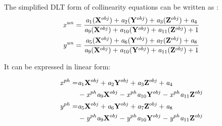 \documentclass[a4paper,12pt]{article}
\newcommand{\evect}[1]{%
{\bf #1}%
}
\newcommand{\escal}[1]{%
{\it #1}%
}
\begin{document}
The simplified DLT form of collinearity equations can be written as \cite[p. 130]{pavelka2004foto10}:  
\begin{equation}
\begin{split}
&\escal{x}^{un} = \frac{\escal{a}_{1}(\evect{X}^{obj}) + 
                                  \escal{a}_{2}(\evect{Y}^{obj}) + 
                                  \escal{a}_{3}(\evect{Z}^{obj}) +
                                  \escal{a}_{4}
                                  }{
				  \escal{a}_{9}(\evect{X}^{obj}) + 
                                  \escal{a}_{10}(\evect{Y}^{obj}) + 
                                  \escal{a}_{11}(\evect{Z}^{obj}) +
                                   1  
                                  } \\
&\escal{y}^{un} = \frac{\escal{a}_{5}(\evect{X}^{obj}) + 
                                  \escal{a}_{6}(\evect{Y}^{obj}) + 
                                  \escal{a}_{7}(\evect{Z}^{obj}) +                                 
                                  \escal{a}_{8}
                                  }{
				  \escal{a}_{9}(\evect{X}^{obj}) + 
                                  \escal{a}_{10}(\evect{Y}^{obj}) + 
                                  \escal{a}_{11}(\evect{Z}^{obj}) +    
                                  1
                                  }
\end{split}
\end{equation}
 
It can be expressed in linear form:

\begin{equation}
\begin{split}
\escal{x}^{ph} =& \escal{a}_{1}\evect{X}^{obj} + 
                                  \escal{a}_{2}\evect{Y}^{obj} + 
                                  \escal{a}_{3}\evect{Z}^{obj} +
                                  \escal{a}_{4} \\
				  &- \escal{x}^{ph} \escal{a}_{9}\evect{X}^{obj} -
                                  \escal{x}^{ph} \escal{a}_{10}\evect{Y}^{obj} - 
                                  \escal{x}^{ph} \escal{a}_{11}\evect{Z}^{obj} \\
\escal{y}^{ph} =& \escal{a}_{5}\evect{X}^{obj} + 
                                  \escal{a}_{6}\evect{Y}^{obj} + 
                                  \escal{a}_{7}\evect{Z}^{obj} +                                 
                                  \escal{a}_{8}\\
				  &- \escal{y}^{ph} \escal{a}_{9}\evect{X}^{obj} -
                                  \escal{y}^{ph} \escal{a}_{10}\evect{Y}^{obj} - 
                                  \escal{y}^{ph} \escal{a}_{11}\evect{Z}^{obj}    
\end{split}
\end{equation}
 
\end{document}
